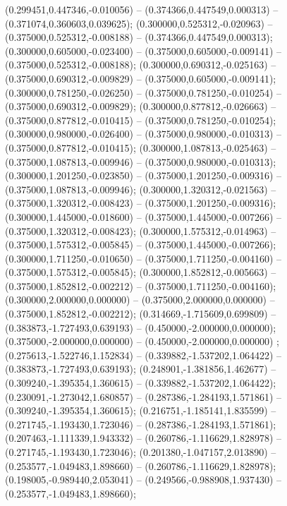  (0.299451,0.447346,-0.010056) -- (0.374366,0.447549,0.000313) -- (0.371074,0.360603,0.039625);
 (0.300000,0.525312,-0.020963) -- (0.375000,0.525312,-0.008188) -- (0.374366,0.447549,0.000313);
 (0.300000,0.605000,-0.023400) -- (0.375000,0.605000,-0.009141) -- (0.375000,0.525312,-0.008188);
 (0.300000,0.690312,-0.025163) -- (0.375000,0.690312,-0.009829) -- (0.375000,0.605000,-0.009141);
 (0.300000,0.781250,-0.026250) -- (0.375000,0.781250,-0.010254) -- (0.375000,0.690312,-0.009829);
 (0.300000,0.877812,-0.026663) -- (0.375000,0.877812,-0.010415) -- (0.375000,0.781250,-0.010254);
 (0.300000,0.980000,-0.026400) -- (0.375000,0.980000,-0.010313) -- (0.375000,0.877812,-0.010415);
 (0.300000,1.087813,-0.025463) -- (0.375000,1.087813,-0.009946) -- (0.375000,0.980000,-0.010313);
 (0.300000,1.201250,-0.023850) -- (0.375000,1.201250,-0.009316) -- (0.375000,1.087813,-0.009946);
 (0.300000,1.320312,-0.021563) -- (0.375000,1.320312,-0.008423) -- (0.375000,1.201250,-0.009316);
 (0.300000,1.445000,-0.018600) -- (0.375000,1.445000,-0.007266) -- (0.375000,1.320312,-0.008423);
 (0.300000,1.575312,-0.014963) -- (0.375000,1.575312,-0.005845) -- (0.375000,1.445000,-0.007266);
 (0.300000,1.711250,-0.010650) -- (0.375000,1.711250,-0.004160) -- (0.375000,1.575312,-0.005845);
 (0.300000,1.852812,-0.005663) -- (0.375000,1.852812,-0.002212) -- (0.375000,1.711250,-0.004160);
 (0.300000,2.000000,0.000000) -- (0.375000,2.000000,0.000000) -- (0.375000,1.852812,-0.002212);
 (0.314669,-1.715609,0.699809) -- (0.383873,-1.727493,0.639193) -- (0.450000,-2.000000,0.000000);
 (0.375000,-2.000000,0.000000) -- (0.450000,-2.000000,0.000000) ;
 (0.275613,-1.522746,1.152834) -- (0.339882,-1.537202,1.064422) -- (0.383873,-1.727493,0.639193);
 (0.248901,-1.381856,1.462677) -- (0.309240,-1.395354,1.360615) -- (0.339882,-1.537202,1.064422);
 (0.230091,-1.273042,1.680857) -- (0.287386,-1.284193,1.571861) -- (0.309240,-1.395354,1.360615);
 (0.216751,-1.185141,1.835599) -- (0.271745,-1.193430,1.723046) -- (0.287386,-1.284193,1.571861);
 (0.207463,-1.111339,1.943332) -- (0.260786,-1.116629,1.828978) -- (0.271745,-1.193430,1.723046);
 (0.201380,-1.047157,2.013890) -- (0.253577,-1.049483,1.898660) -- (0.260786,-1.116629,1.828978);
 (0.198005,-0.989440,2.053041) -- (0.249566,-0.988908,1.937430) -- (0.253577,-1.049483,1.898660);
